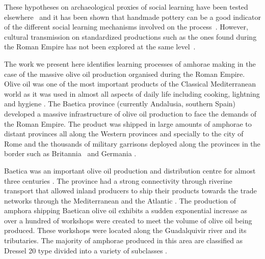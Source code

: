 \documentclass[review]{elsarticle}
\begin{document}
These hypotheses on archaeological proxies of social learning have been tested elsewhere~\citep{roux_standardization_2015} and it has been shown that handmade pottery can be a good indicator of the different social learning mechanisms involved on the process~\citep{steele_james_ceramic_2010,neiman_stylistic_1995, shennan_ceramic_2001}. However, cultural transmission on standardized productions such as the ones found during the Roman Empire has not been explored at the same level~\citep{bevan_mediterranean_2014}.

The work we present here identifies learning processes of amhorae making in the case of the massive olive oil production organised during the Roman Empire. Olive oil was one of the most important products of the Classical Mediterranean world as it was used in almost all aspects of daily life including cooking, lightning and hygiene \citep{mattingly_d.j._oil_1988}. The Baetica province (currently Andalusia, southern Spain) developed a massive infrastructure of olive oil production to face the demands of the Roman Empire. The product was shipped in large amounts of amphorae to distant provinces all along the Western provinces and specially to the city of Rome and the thousands of military garrisons deployed along the provinces in the border such as Britannia~\citep{monfort_britannia_1998,funari_economic_2005} and Germania \citep{remesal_annona_1986}. 

Baetica was an important olive oil production and distribution centre for almost three centuries \citep{millet_anforas_1998, rodriguez_baetican_1998,chic2005comercio,rodriguez_economioleicola_1977}. The province had a strong connectivity through riverine transport that allowed inland producers to ship their products towards the trade networks through the Mediterranean and the Atlantic \citep{garcia_vargas_enrique_formal_2010}. The production of amphora shipping Baetican olive oil exhibits a sudden exponential increase as over a hundred of workshops were created to meet the volume of olive oil being produced. These workshops were located along the Guadalquivir river and its tributaries. The majority of amphorae produced in this area are classified as Dressel 20 type divided into a variety of subclasses \citep{martin-kilcher_romischen_1994,berni_millet_epigrafianforica_2008}.
\end{document}
